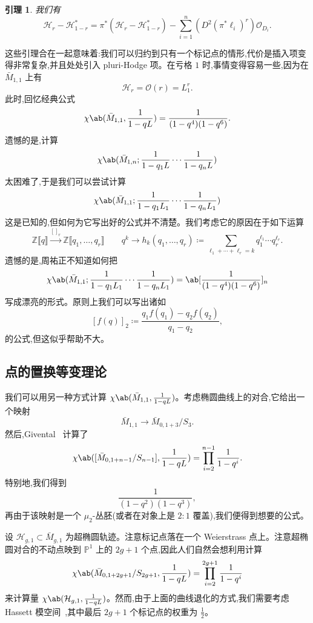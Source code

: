 \documentclass{amsart}
\newtheorem{lem}[thm]{引理}
\theoremstyle{definition}
\theoremstyle{remark}
\theoremstyle{plain}
\theoremstyle{definition}
\theoremstyle{remark}
\newcommand{\Z}{\mathbb{Z}}
\renewcommand{\P}{\mathbb{P}}
\newcommand{\mc}[1]{\mathcal{#1}}
\newcommand{\1}{\mathbf{1}}
\newcommand{\2}{\mathbf{2}}
\newcommand{\3}{\mathbf{3}}
\newcommand{\ps}[1]{\llbracket #1 \rrbracket}
\begin{document}
\begin{lem}
    我们有
    \[ \mc{H}_r - \mc{H}_{1-r}^* = \pi^* (\mc{H}_r - \mc{H}_{1-r}^*) - \sum_{i=1}^n (D^2 (\pi^* \ell_i)^r) \mc{O}_{D_i}. \]
\end{lem}

这些引理合在一起意味着:我们可以归约到只有一个标记点的情形,代价是插入项变得非常复杂,并且处处引入 pluri-Hodge 项。在亏格 \(1\) 时,事情变得容易一些,因为在 \(\bar{M}_{1,1}\) 上有
\[ \mc{H}_r = \mc{O}(r) = L_1^r. \]
此时,回忆经典公式
\[ \chi\ab(\bar{M}_{1,1}, \frac{1}{1-qL}) = \frac{1}{(1-q^4)(1-q^6)}. \]
遗憾的是,计算
\[ \chi\ab(\bar{M}_{1,n}; \frac{1}{1-q_1 L} \cdots \frac{1}{1-q_n L}) \]
太困难了,于是我们可以尝试计算
\[ \chi\ab(\bar{M}_{1,1}; \frac{1}{1-q_1 L_1} \cdots \frac{1}{1-q_n L_1})  \]
这是已知的,但如何为它写出好的公式并不清楚。我们考虑它的原因在于如下运算
\[ \Z\ps{q} \xrightarrow{[]_r} \Z\ps{q_1, \ldots, q_r} \qquad q^k \to h_k(q_1, \ldots, q_r) \coloneqq \sum_{\ell_1 + \cdots + \ell_r = k} q_1^{\ell_1} \cdots q_r^{\ell_r}. \]
遗憾的是,周祐正不知道如何把
\[ \chi\ab(\bar{M}_{1,1}; \frac{1}{1-q_1 L_1} \cdots \frac{1}{1-q_n L_1}) = \ab[\frac{1}{(1-q^4)(1-q^6)}]_n \]
写成漂亮的形式。原则上我们可以写出诸如
\[ [f(q)]_2 \coloneqq \frac{q_1 f(q_1) - q_2 f(q_2)}{q_1 - q_2}, \]
的公式,但这似乎帮助不大。

\subsection{点的置换等变理论}%
\label{sub:Permutation-equivariant theory of a point}

我们可以用另一种方式计算 \(\chi\ab(\bar{M}_{1,1}, \frac{1}{1-q L})\)。考虑椭圆曲线上的对合,它给出一个映射
\[ \bar{M}_{1,1} \to \bar{M}_{0,1+3}/S_3. \]
然后,Givental~\cite{Givental2017K1} 计算了
\[ \chi\ab([\bar{M}_{0,1+n-1}/S_{n-1}], \frac{1}{1-qL}) = \prod_{i=2}^{n-1} \frac{1}{1-q^i}. \]
特别地,我们得到
\[ \frac{1}{(1-q^2)(1-q^3)}, \]
再由于该映射是一个 \(\mu_2\)-丛胚(或者在对象上是 \(2:1\) 覆盖),我们便得到想要的公式。

设 \(\mc{H}_{g,1} \subset \bar{M}_{g,1}\) 为超椭圆轨迹。注意标记点落在一个 Weierstrass 点上。注意超椭圆对合的不动点映到 \(\P^1\) 上的 \(2g+1\) 个点,因此人们自然会想利用计算
\[ \chi\ab(\bar{M}_{0,1+2g+1}/S_{2g+1}, \frac{1}{1-q L}) = \prod_{i=2}^{2g+1} \frac{1}{1-q^i} \]
来计算量
\(\chi\ab(\mc{H}_{g,1}, \frac{1}{1-qL})\)。然而,由于上面的曲线退化的方式,我们需要考虑 Hassett 模空间~\cite{Hassett2003},其中最后 \(2g+1\) 个标记点的权重为 \(\frac{1}{2}\)。
 
\end{document}
